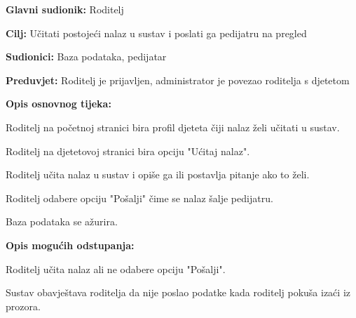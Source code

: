 						\noindent {}
					\begin{packed_item}
						
						\item \textbf{Glavni sudionik: }Roditelj
						\item  \textbf{Cilj:} Učitati postojeći nalaz u sustav i poslati ga pedijatru na pregled
						\item  \textbf{Sudionici:} Baza podataka, pedijatar
						\item  \textbf{Preduvjet:} Roditelj je prijavljen, administrator je povezao roditelja s djetetom
						\item  \textbf{Opis osnovnog tijeka:}
						
						\item[] \begin{packed_enum}
							
							\item Roditelj na početnoj stranici bira profil djeteta čiji nalaz želi učitati u sustav.
							\item Roditelj na djetetovoj stranici bira opciju "Ućitaj nalaz".
							\item Roditelj učita nalaz u sustav i opiše ga ili postavlja pitanje ako to želi.
							\item Roditelj odabere opciju "Pošalji" čime se nalaz šalje pedijatru.
							\item Baza podataka se ažurira.
						\end{packed_enum}
						
						\item  \textbf{Opis mogućih odstupanja:}
						
						\item[] \begin{packed_item}
							
							\item[4.a] Roditelj učita nalaz ali ne odabere opciju "Pošalji".
							\item[] \begin{packed_enum}
								
								\item Sustav obavještava roditelja da nije poslao podatke kada roditelj pokuša izaći iz prozora.
							\end{packed_enum}
							
							
						\end{packed_item}
					\end{packed_item}
					
